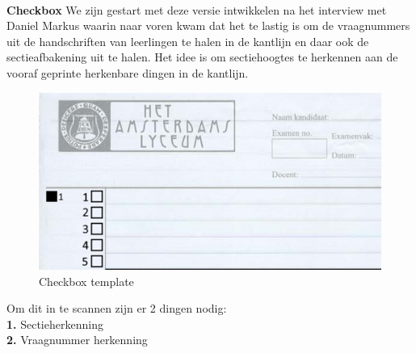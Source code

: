 \documentclass[12pt]{article}
\begin{document}
\\
\begin{multicols}{2} 
\textbf{Checkbox}
We zijn gestart met deze versie intwikkelen na het interview met Daniel Markus waarin naar voren kwam dat het te lastig is om de vraagnummers uit de handschriften van leerlingen te halen in de kantlijn en daar ook de sectieafbakening uit te halen. Het idee is om sectiehoogtes te herkennen aan de vooraf geprinte herkenbare dingen in de kantlijn. 
\begin{figure}[H]
    \centering
    \includegraphics[width=\linewidth]{./images/methoden/inscannen/sectie/checkbox/template.png}
    \caption{Checkbox template}
    \label{fig:enter-label}
\end{figure}
\end{multicols} 


Om dit in te scannen zijn er 2 dingen nodig: \\
\textbf{1. } Sectieherkenning\\
\textbf{2. } Vraagnummer herkenning \\

\end{document}
